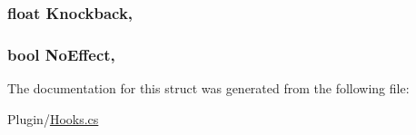 \subsubsection[{Knockback}]{\setlength{\rightskip}{0pt plus 5cm}float Knockback\hspace{0.3cm}{\ttfamily [get]}, {\ttfamily [set]}}\label{structOTA_1_1Plugin_1_1HookArgs_1_1NpcHurt_ad22d30a3970ffaf441871a8c7cb6c1f5}
\hypertarget{structOTA_1_1Plugin_1_1HookArgs_1_1NpcHurt_abff76c9fa8b92317d41a90afe2d4c368}{}
\subsubsection[{No\+Effect}]{\setlength{\rightskip}{0pt plus 5cm}bool No\+Effect\hspace{0.3cm}{\ttfamily [get]}, {\ttfamily [set]}}\label{structOTA_1_1Plugin_1_1HookArgs_1_1NpcHurt_abff76c9fa8b92317d41a90afe2d4c368}


The documentation for this struct was generated from the following file\+:\begin{DoxyCompactItemize}
\item 
Plugin/\hyperlink{Hooks_8cs}{Hooks.\+cs}\end{DoxyCompactItemize}
